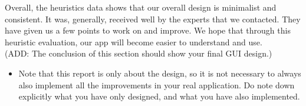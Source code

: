 \documentclass{article}
\begin{document}
Overall, the heuristics data shows that our overall design is minimalist and consistent.
It was, generally, received well by the experts that we contacted.
They have given us a few points to work on and improve.
We hope that through this heuristic evaluation, our app will become easier to understand and use. \\

(ADD: The conclusion of this section should show your final GUI design.)
\begin{itemize}
    \item Note that this report is only about the design, so it is not necessary to always also implement all the improvements in your real application. Do note down explicitly what you have only designed, and what you have also implemented.
\end{itemize}




\end{document}
